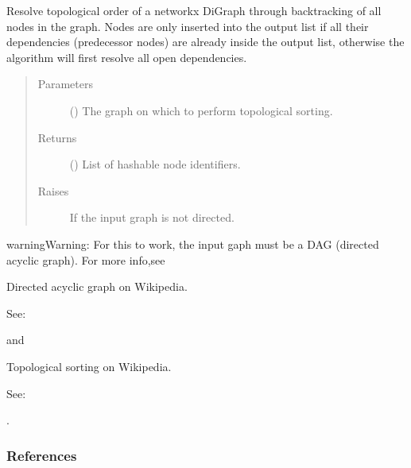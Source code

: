 \documentclass[letterpaper,10pt,english]{sphinxmanual}
\begin{document}
\begin{fulllineitems}
\label{\detokenize{cockatoo:cockatoo.utilities.resolve_order_by_backtracking}}
Resolve topological order of a networkx DiGraph through backtracking of
all nodes in the graph. Nodes are only inserted into the output list if
all their dependencies (predecessor nodes) are already inside the output
list, otherwise the algorithm will first resolve all open dependencies.
\begin{quote}\begin{description}
\item[{Parameters}] \leavevmode
{} () \textendash{} The graph on which to perform topological sorting.

\item[{Returns}] \leavevmode
{} () \textendash{} List of hashable node identifiers.

\item[{Raises}] \leavevmode
{} \textendash{} If the input graph is not directed.

\end{description}\end{quote}

\begin{sphinxadmonition}{warning}{Warning:}
For this to work, the input gaph must be a DAG (directed acyclic graph).
For more info,see %
\begin{footnote}[11]\sphinxAtStartFootnote
Directed acyclic graph on Wikipedia.

See: \sphinxfootnotemark[65]
%
\end{footnote}%
\begin{footnotetext}[65]\sphinxAtStartFootnote
{}
%
\end{footnotetext}\ignorespaces  and %
\begin{footnote}[12]\sphinxAtStartFootnote
Topological sorting on Wikipedia.

See: \sphinxfootnotemark[66]
%
\end{footnote}%
\begin{footnotetext}[66]\sphinxAtStartFootnote
{}
%
\end{footnotetext}\ignorespaces .
\end{sphinxadmonition}
\subsubsection*{References}

\end{fulllineitems}
\end{document}
